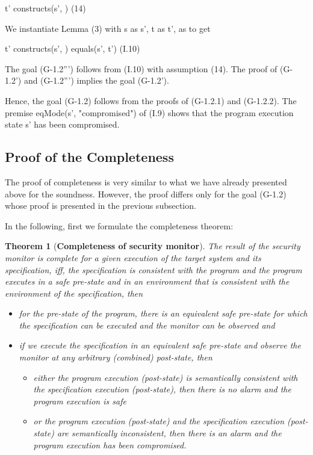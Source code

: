 \documentclass[conference]{IEEEtran}
\newtheorem{thm}{Theorem}
\begin{document}
\begin{center}
t'  constructs(s', )  \hspace*{1.7cm}(14)
 \end{center}
 
\noindent We instantiate Lemma (3) with
s as s', t as t',  as  to get

\begin{center}
t'  constructs(s', )   equals(s', t')  \hspace*{0.3cm} (I.10)
\end{center}

The goal (G-1.2''') follows from (I.10) with assumption (14). The proof of (G-1.2') and (G-1.2''') implies the goal (G-1.2'). 

\noindent Hence, the goal (G-1.2) follows from the proofs of (G-1.2.1) and (G-1.2.2). The premise eqMode(s', "compromised") of (I.9) shows that the program execution state s' has been compromised.

\subsection{Proof of the Completeness}
The proof of completeness is very similar to what we have already presented above for the soundness. However, the proof differs only for the goal (G-1.2) whose proof is presented in the previous subsection.

In the following, first we formulate the completeness theorem:

\begin{thm}[\textbf{Completeness of security monitor}]\label{completeness} 
The result of the security monitor is complete for a given execution of the target system and its specification, iff, the specification is consistent with the program and the program executes in a safe pre-state and in an environment that is consistent with the environment of the specification, then 
\begin{itemize}
\item for the pre-state of the program, there is an equivalent safe pre-state for which the specification can be executed and the monitor can be observed and
\item if we execute the specification in an equivalent safe pre-state and observe the monitor at any arbitrary (combined) post-state, then 
\begin{itemize}
\item either the program execution (post-state) is semantically consistent with the specification execution (post-state), then there is no alarm and the program execution is safe
\item or the program execution (post-state) and the specification execution (post-state) are semantically inconsistent, then there is an alarm and the program execution has been compromised.
\end{itemize} 
\end{itemize}
\end{thm}
\end{document}
